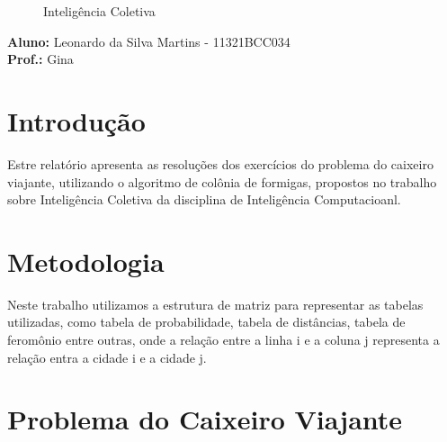 \documentclass[hidelinks,12pt]{article}
\newcommand{\bigicon}[1]{\texttt{[image: \#1]}}
\begin{document}
\pagestyle{fancy}


\lhead{\bigicon{Figures/ufu}}
\rhead{\bigicon{Figures/facom}}
\lfoot{}
\cfoot{}
\rfoot{}
\vspace*{10cm}
\begin{figure}[!h]
	\centering
	\Huge{Inteligência Coletiva}
\end{figure}

\vspace{5cm}
\noindent\textbf{Aluno:} Leonardo da Silva Martins - 11321BCC034\\
\textbf{Prof.:} Gina


\newpage
\fancyhead[C]{}
\fancyhead[R]{}
\fancyhead[L]{\leftmark}
\fancyfoot{}
\fancyfoot[C]{\hspace{1.5cm}\thepage}


\tableofcontents

{\let\thefootnote\relax{}}

\newpage

\section{Introdução}

    Estre relatório apresenta as resoluções dos exercícios do problema do caixeiro viajante, utilizando o algoritmo de colônia de formigas, propostos no trabalho sobre Inteligência Coletiva da disciplina de Inteligência Computacioanl.

\section{Metodologia}
	
	Neste trabalho utilizamos a estrutura de matriz para representar as tabelas utilizadas, como tabela de probabilidade, tabela de distâncias, tabela de feromônio entre outras, onde a relação entre a linha i e a coluna j representa a relação entra a cidade i e a cidade j.

\section{Problema do Caixeiro Viajante}
	
\end{document}
